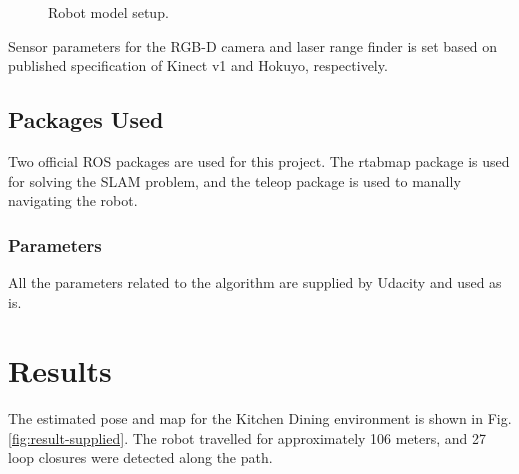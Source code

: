 \documentclass[10pt,journal,compsoc]{IEEEtran}
\begin{document}
\begin{figure}[thpb]
      \centering
      \hfill
      \caption{Robot model setup.}
\end{figure}

Sensor parameters for the RGB-D camera and laser range finder is set based on published specification of Kinect v1 and Hokuyo, respectively.

\subsection{Packages Used}
Two official ROS packages are used for this project. The rtabmap package is used for solving the SLAM problem, and the teleop package is used to manally navigating the robot. 

\subsubsection{Parameters}
All the parameters related to the algorithm are supplied by Udacity and used as is.

\section{Results}
The estimated pose and map for the Kitchen Dining environment is shown in Fig. \ref{fig:result-supplied}. The robot travelled for approximately 106 meters, and 27 loop closures were detected along the path.
\end{document}
